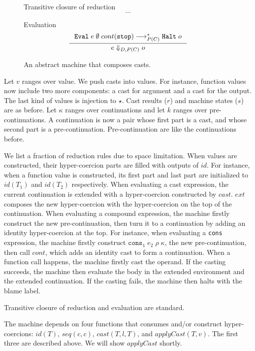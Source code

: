 \documentclass[acmsmall,review,anonymous]{acmart}\settopmatter{printfolios=true,printccs=false,printacmref=false}
\newcommand{\sOOinspect}[3]{\mathtt{Eval} \; #1 \; #2 \; #3}
\newcommand{\sOOhalt}[1]{\mathtt{Halt} \; #1}
\newcommand{\TOOdyn}[0]{\star}
\newcommand{\hckOOmt}[0]{\mathtt{stop}}
\newcommand{\hckOOconsI}[3]{\mathtt{cons_1}\;#1\;#2\;#3}
\begin{document}
\begin{figure}
	Transitive closure of reduction 
	\[\dots\]
	
	Evaluation 
	\[
	\inference{
		\sOOinspect{e}{\emptyset}{cont(\hckOOmt)} \longrightarrow_{P(C)}^{*} 
		\sOOhalt{o}
	}{
		e \Downarrow_{D,P(C)} o
	}
	\]
	
	\caption{An abstract machine that composes casts.}
	\label{machine-cekcc}
\end{figure}

Let $ v $ ranges over value. We push casts into values. For instance, function 
values now include two more components: a cast for argument and a cast for the 
output. The last kind of values is injection to $ \TOOdyn $. 
Cast results ($ r $) and machine states ($ s $) are as before. 
Let $ \kappa $ ranges over continuations and let $ k $ ranges over 
pre-continuations. 
A continuation is now a pair whose first part is a cast, and whose second part 
is a pre-continuation. 
Pre-continuation are like the continuations before.

We list a fraction of reduction rules due to space limitation.
When values are constructed, their hyper-coercion parts are filled with outputs 
of $ id $. For instance, when a function value is constructed, its first part 
and last part are initialized to $ id(T_1) $ and $ id(T_2) $ respectively.
When evaluating a cast expression, the current continuation is extended with a 
hyper-coercion constructed by $ cast $. $ ext $ composes the new hyper-coercion 
with the hyper-coercion on the top of the continuation.
When evaluating a compound expression, the machine firstly construct the new 
pre-continuation, then turn it to a continuation by adding an identity 
hyper-coercion at the top. For instance, when evaluating a \texttt{cons} 
expression, the machine firstly construct $ \hckOOconsI{e_2}{\rho}{\kappa} $, 
the new pre-continuation, then call $ cont $, which adds an identity cast to 
form a continuation. 
When a function call happens, the machine firstly cast the operand. If the 
casting succeeds, the machine then evaluate the body in the extended 
environment and the extended continuation. If the casting fails, the machine 
then halts with the blame label.

Transitive closure of reduction and evaluation are standard.

The machine depends on four functions that consumes and/or construct 
hyper-coercions: $ id(T) $, $ seq(c,c) $, $ cast(T,l,T) $, and $ applyCast(T,v) 
$. The first three are described above. We will show $ applyCast $ shortly.
\end{document}
